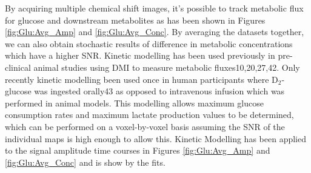 \documentclass[class=article, crop=false]{standalone}
\begin{document}
By acquiring multiple chemical shift images, it’s possible to track metabolic flux for glucose and downstream metabolites as has been shown in Figures \ref{fig:Glu:Avg_Amp} and \ref{fig:Glu:Avg_Conc}. By averaging the datasets together, we can also obtain stochastic results of difference in metabolic concentrations which have a higher SNR. Kinetic modelling has been used previously in pre-clinical animal studies using DMI to measure metabolic fluxes10,20,27,42. Only recently kinetic modelling been used once in human participants where D$_2$-glucose was ingested orally43 as opposed to intravenous infusion which was performed in animal models. This modelling allows maximum glucose consumption rates and maximum lactate production values to be determined, which can be performed on a voxel-by-voxel basis assuming the SNR of the individual maps is high enough to allow this. Kinetic Modelling has been applied to the signal amplitude time courses in Figures \ref{fig:Glu:Avg_Amp} and \ref{fig:Glu:Avg_Conc} and is show by the fits.

\end{document}

